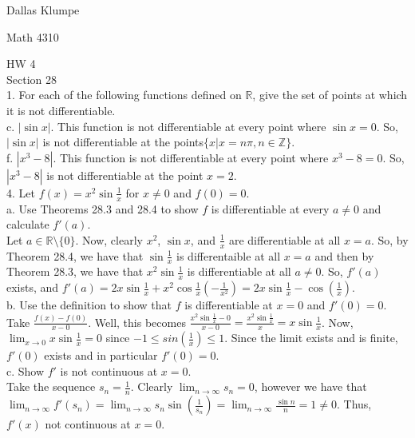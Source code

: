 \documentclass[12pt]{article}
\begin{document}
\noindent Dallas Klumpe

\noindent Math 4310

\noindent HW 4\\

Section 28\\

1. For each of the following functions defined on $\mathbb{R}$, give the set of points at which it is not differentiable.\\
c. $|\sin x|$. This function is not differentiable at every point where $\sin x=0$. So, $|\sin x|$ is not differentiable at the points$\{x|x=n\pi,n\in\mathbb{Z}\}$.\\
f. $|x^3-8|$. This function is not differentiable at every point where $x^3-8=0$. So, $|x^3-8|$ is not differentiable at the point $x=2$.\\[20pt]

4. Let $f(x)=x^2\sin{\frac{1}{x}}$ for $x\neq0$ and $f(0)=0$.\\
a. Use Theorems 28.3 and 28.4 to show $f$ is differentiable at every $a\neq0$ and calculate $f'(a)$.\\
Let $a\in\mathbb{R}\setminus\{0\}$. Now, clearly $x^2$, $\sin x$, and $\frac1x$ are differentiable at all $x=a$. So, by Theorem 28.4, we have that $\sin{\frac1x}$ is differentaible at all $x=a$ and then by Theorem 28.3, we have that $x^2\sin{\frac1x}$ is differentiable at all $a\neq0$. So, $f'(a)$ exists, and $f'(a)=2x\sin{\frac1x}+x^2\cos{\frac1x}(-\frac{1}{x^2})=2x\sin{\frac1x}-\cos({\frac1x})$.\\
b. Use the definition to show that $f$ is differentiable at $x=0$ and $f'(0)=0$.\\
Take $\frac{f(x)-f(0)}{x-0}$. Well, this becomes $\frac{x^2\sin{\frac{1}{x}}-0}{x-0}=\frac{x^2\sin{\frac{1}{x}}}{x}=x\sin{\frac{1}{x}}$. Now, $\lim_{x\rightarrow0}x\sin{\frac{1}{x}}=0$ since $-1\leq sin(\frac1x)\leq1$. Since the limit exists and is finite, $f'(0)$ exists and in particular $f'(0)=0$.\\
c. Show $f'$ is not continuous at $x=0$.\\
Take the sequence $s_n=\frac{1}{n}$. Clearly $\lim_{n\rightarrow\infty}s_n=0$, however we have that $\lim_{n\rightarrow\infty}f'(s_n)=\lim_{n\rightarrow\infty}s_n\sin(\frac{1}{s_n})=\lim_{n\rightarrow\infty}\frac{\sin n}{n}=1\neq0$. Thus, $f'(x)$ not continuous at $x=0$.\\[20pt]
\end{document}
